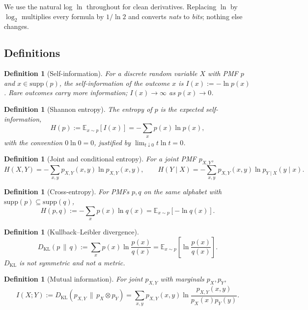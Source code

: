 \documentclass[11pt]{article}
\newtheorem{definition}[theorem]{Definition}
\theoremstyle{remark}
\begin{document}
We use the natural log $\ln$ throughout for clean derivatives. Replacing $\ln$ by $\log_2$ multiplies every formula by $1/\ln 2$ and converts \emph{nats} to \emph{bits}; nothing else changes.

\subsection*{Definitions}

\begin{definition}[Self-information]
For a discrete random variable $X$ with PMF $p$ and $x \in \mathrm{supp}(p)$, the \emph{self-information} of the outcome $x$ is $I(x) := -\ln p(x)$. Rare outcomes carry more information; $I(x) \to \infty$ as $p(x) \to 0$.
\end{definition}

\begin{definition}[Shannon entropy]
The \emph{entropy} of $p$ is the expected self-information,
\[
H(p) := \mathbb{E}_{x \sim p}[I(x)] = -\sum_{x} p(x) \ln p(x),
\]
with the convention $0 \ln 0 = 0$, justified by $\lim_{t \downarrow 0} t \ln t = 0$.
\end{definition}

\begin{definition}[Joint and conditional entropy]
For a joint PMF $p_{X,Y}$,
\[
H(X, Y) = -\sum_{x,y} p_{X,Y}(x,y) \ln p_{X,Y}(x,y), \qquad H(Y \mid X) = -\sum_{x,y} p_{X,Y}(x,y) \ln p_{Y \mid X}(y \mid x).
\]
\end{definition}

\begin{definition}[Cross-entropy]
For PMFs $p, q$ on the same alphabet with $\mathrm{supp}(p) \subseteq \mathrm{supp}(q)$,
\[
H(p, q) := -\sum_{x} p(x) \ln q(x) = \mathbb{E}_{x \sim p}[-\ln q(x)].
\]
\end{definition}

\begin{definition}[Kullback--Leibler divergence]
\[
D_{\mathrm{KL}}(p \,\|\, q) := \sum_{x} p(x) \ln \frac{p(x)}{q(x)} = \mathbb{E}_{x \sim p}\!\left[\ln \frac{p(x)}{q(x)}\right].
\]
$D_{\mathrm{KL}}$ is \emph{not} symmetric and \emph{not} a metric.
\end{definition}

\begin{definition}[Mutual information]
For joint $p_{X,Y}$ with marginals $p_X, p_Y$,
\[
I(X; Y) := D_{\mathrm{KL}}(p_{X,Y} \,\|\, p_X \otimes p_Y) = \sum_{x,y} p_{X,Y}(x,y) \ln \frac{p_{X,Y}(x,y)}{p_X(x) p_Y(y)}.
\]
\end{definition}
\end{document}
